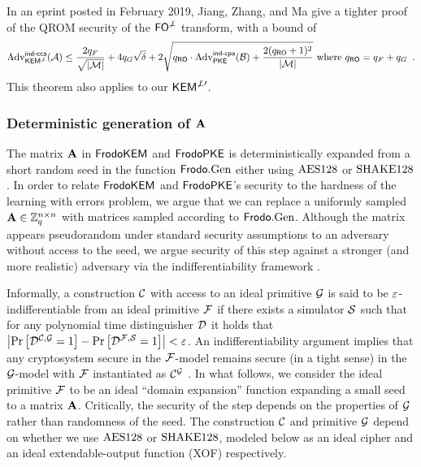 \documentclass{iacrcc}
\begin{document}
In an eprint posted in February 2019, Jiang, Zhang, and Ma
\cite[Theorem~3]{EPRINT:JiaZhaMa19} give a tighter proof of the QROM
security of the $\textsf{\upshape\mdseries FO}^{\not\perp}$ transform, with a bound of
\[
\mathrm{Adv}^{\textsf{\upshape\mdseries ind-cca}}_{\textsf{\upshape\mdseries KEM}^{\not\perp}}(\mathcal{A}) 
\le
\frac{2 q_F}{\sqrt{|\mathcal{M}|}}
+ 4 q_G \sqrt{\delta}
+ 2 \sqrt{
	q_{\mathsf{RO}} \cdot \mathrm{Adv}^{\textsf{\upshape\mdseries ind-cpa}}_{\textsf{\upshape\mdseries PKE}}(\mathcal{B})
	+ \frac{2 (q_{\mathsf{RO}} + 1)^2}{|\mathcal{M}|}
}
\textrm{ where }q_{\mathsf{RO}}=q_F+q_G \enspace.
\]
This theorem also applies to our $\textsf{\upshape\mdseries KEM}^{\not\perp\prime}$.

\subsubsection{Deterministic generation of $\mathbf{A}$}\label{sec:strength:pseudorandom-A}

\newcommand{\idx}{\ensuremath{\mathsf{idx}}}
\newcommand{\Idx}{\ensuremath{\mathrm{Idx}}}
\newcommand{\IC}{\ensuremath{\mathrm{IC}}}

The matrix $\mathbf{A}$ in $\textsf{\upshape\mdseries FrodoKEM}$ and $\textsf{\upshape\mdseries FrodoPKE}$ is  deterministically expanded from a short random seed in the function $\textsf{\upshape\mdseries Frodo}.\textrm{\upshape\mdseries Gen}$ either using $\textrm{\upshape\mdseries AES128}$ or $\textrm{\upshape\mdseries SHAKE}128$. In order to
relate $\textsf{\upshape\mdseries FrodoKEM}$ and $\textsf{\upshape\mdseries FrodoPKE}$'s security to the hardness of the learning with errors
problem, we argue that we can replace a uniformly sampled $\mathbf{A}\in
\mathbb{Z}_q^{n\times n}$ with matrices sampled according to
$\textsf{\upshape\mdseries Frodo}.\textrm{\upshape\mdseries Gen}$. Although the matrix appears pseudorandom under standard security assumptions to an adversary without access to the seed, we argue security of this step against a stronger (and more realistic) adversary via the indifferentiability framework
\cite{TCC:MauRenHol04, C:CDMP05}.

Informally, a construction $\mathcal{C}$ with
access to an ideal primitive $\mathcal{G}$ is said to be $\varepsilon$-indifferentiable
from an ideal primitive $\mathcal{F}$ if there exists a simulator $\mathcal{S}$ such that
for any polynomial time distinguisher $\mathcal{D}$ it holds that $\left| \Pr\left[
\mathcal{D}^{\mathcal{C}, \mathcal{G}} = 1  \right] - \Pr\left[\mathcal{D}^{\mathcal{F}, \mathcal{S}} = 1
\right] \right|< \varepsilon$. An
indifferentiability argument implies that any cryptosystem secure in the
$\mathcal{F}$-model remains secure (in a tight sense) in the $\mathcal{G}$-model with
$\mathcal{F}$ instantiated as $\mathcal{C}^{\mathcal{G}}$ \cite{TCC:MauRenHol04}. In what follows, we consider the ideal
primitive $\mathcal{F}$ to be an ideal ``domain expansion'' function expanding a small
seed to a matrix $\mathbf{A}$. Critically, the security of the step depends on the properties of $\mathcal{G}$ rather than randomness of the seed. The construction $\mathcal{C}$ and primitive
$\mathcal{G}$ depend on whether we use $\textrm{\upshape\mdseries AES128}$ or $\textrm{\upshape\mdseries SHAKE}128$, modeled below as an ideal cipher and an ideal extendable-output function (XOF) respectively.
\end{document}
